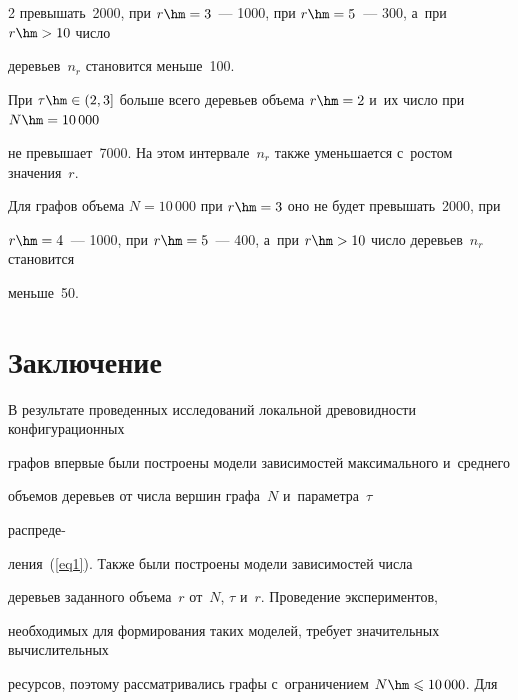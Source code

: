 \begin{multicols}{2}
превышать~2000, при $r\hm=3$~--- 1000, при $r\hm=5$~--- 300, а~при $r\hm>10$ число 


деревьев~$n_r$ становится меньше~100.


При $\tau\hm\in(2,3]$ больше всего деревьев объема $r\hm=2$ и~их чис\-ло при $N\hm=10\,000$ 


не превышает~7000. На этом интервале~$n_r$ также уменьшается с~рос\-том значения~$r$. 


Для графов объема $N=10\,000$ при $r\hm=3$ оно не будет превышать~2000, при 


$r\hm=4$~--- 1000, при $r\hm=5$~--- 400, а~при $r\hm>10$ чис\-ло деревьев~$n_r$ становится 


меньше~50.





\vspace*{-6pt}








\section{Заключение}








В результате проведенных исследований локальной древовидности конфигурационных 


графов впервые были по\-стро\-ены модели зависимостей максимального и~среднего 


объемов деревьев от числа вершин графа~$N$ и~па\-ра\-мет\-ра~$\tau$ 


распреде-\linebreak\vspace*{-12pt}





\pagebreak





\noindent


ления~(\ref{eq1}). Также были построены модели зависимостей чис\-ла 


деревьев заданного объема~$r$ от~$N$, $\tau$ и~$r$. Проведение экспериментов, 


необходимых для формирования таких моделей, требует значительных вы\-чис\-ли\-тель\-ных 


ресурсов, поэтому рас\-смат\-ри\-ва\-лись графы с~ограничением $N\hm\leqslant 10\,000$. Для 



\end{multicols}

